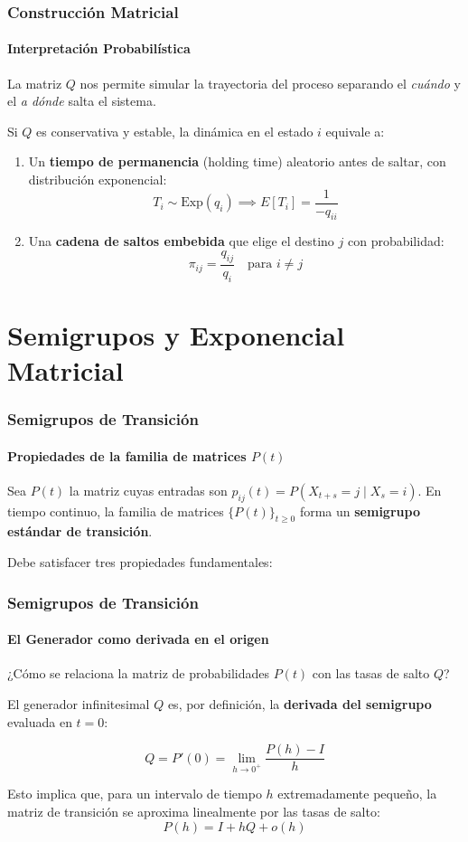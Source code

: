 \documentclass{beamer}
\begin{document}
\begin{frame}
\frametitle{Construcción Matricial}
\framesubtitle{Interpretación Probabilística}

La matriz $Q$ nos permite simular la trayectoria del proceso separando el \textit{cuándo} y el \textit{a dónde} salta el sistema.

\begin{theorem}
Si $Q$ es conservativa y estable, la dinámica en el estado $i$ equivale a:
\begin{enumerate}
    \item Un \textbf{tiempo de permanencia} (holding time) aleatorio antes de saltar, con distribución exponencial:
    \[ T_i \sim \text{Exp}(q_i) \implies E[T_i] = \frac{1}{-q_{ii}} \]
    
    \item Una \textbf{cadena de saltos embebida} que elige el destino $j$ con probabilidad:
    \[ \pi_{ij} = \frac{q_{ij}}{q_i} \quad \text{para } i \neq j \]
\end{enumerate}
\end{theorem}

\end{frame}



\section{Semigrupos y Exponencial Matricial}

\begin{frame}
\frametitle{Semigrupos de Transición}
\framesubtitle{Propiedades de la familia de matrices $P(t)$}

Sea $P(t)$ la matriz cuyas entradas son $p_{ij}(t) = P(X_{t+s}=j \mid X_s=i)$. En tiempo continuo, la familia de matrices $\{P(t)\}_{t \ge 0}$ forma un \textbf{semigrupo estándar de transición}.

\vspace{0.2cm}
Debe satisfacer tres propiedades fundamentales:



\end{frame}


\begin{frame}
\frametitle{Semigrupos de Transición}
\framesubtitle{El Generador como derivada en el origen}

¿Cómo se relaciona la matriz de probabilidades $P(t)$ con las tasas de salto $Q$? 

\vspace{0.3cm}
El generador infinitesimal $Q$ es, por definición, la \textbf{derivada del semigrupo} evaluada en $t = 0$:

\begin{theorem}
\[ Q = P'(0) = \lim_{h \to 0^+} \frac{P(h) - I}{h} \]
\end{theorem}

\vspace{0.2cm}
Esto implica que, para un intervalo de tiempo $h$ extremadamente pequeño, la matriz de transición se aproxima linealmente por las tasas de salto:
\[ P(h) = I + hQ + o(h) \]

\end{frame}
\end{document}
